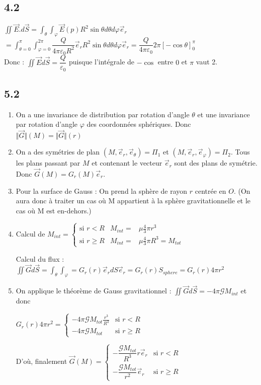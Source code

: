 \documentclass[a4paper,12pt]{book}
\begin{document}
\subsection{4.2}
$\iint \vec{E}.d\vec{S} = \int_\theta\int_\varphi \vec{E}(p)R^2\sin\theta d\theta d\varphi \vec{e}_r$
\\ $=\int_{\theta=0}^{\pi}\int_{\varphi=0}^{2\pi} \dfrac{Q}{4\pi\varepsilon_0R^2}\vec{e}_rR^2\sin\theta d\theta d\varphi \vec{e}_r = \dfrac{Q}{4\pi\varepsilon_0}2\pi\left[-\cos\theta\right]_0^\pi$
\\ Donc : $\iint \vec{E}d\vec{S} = \dfrac{Q}{\varepsilon_0}$ puisque l'intégrale de $-\cos$ entre $0$ et $\pi$ vaut 2.

\subsection{5.2}
\begin{enumerate}
\item On a une invariance de distribution par rotation d'angle $\theta$ et une invariance par rotation d'angle $\varphi$ des coordonnées sphériques. Donc $\Vert\vec{G}\Vert(M) = \Vert\vec{G}\Vert(r)$
\item On a des symétries de plan $(M, \vec{e}_r, \vec{e}_\theta) = \Pi_1$ et $(M, \vec{e}_r, \vec{e}_\varphi) = \Pi_2$. Tous les plans passant par $M$ et contenant le vecteur $\vec{e}_r$ sont des plans de symétrie. Donc $\vec{G}(M) = G_r(M)\vec{e}_r$.
\item Pour la surface de Gauss : On prend la sphère de rayon $r$ centrée en $O$. (On aura donc à traiter un cas où M appartient à la sphère gravitationnelle et le cas où M est en-dehors.)
\item Calcul de $M_{int} = \left\{\begin{array}{rcl} \text{si $r<R$} & M_{int} = & \mu \frac{4}{3}\pi r^3 \\ \text{si $r\geq R$} & M_{int} = & \mu\frac{4}{3}\pi R^3 = M_{tot}\end{array}\right.$
\par Calcul du flux : $ \iint \vec{G} d\vec{S} = \int_\theta\int_\varphi = G_r(r)\vec{e}_rdS\vec{e}_r = G_r(r)S_{sphere} = G_r(r)4\pi r^2$
\item On applique le théorème de Gauss gravitationnel : $\iint \vec{G}d\vec{S} = -4\pi\mathcal{G}M_{int} $ et donc
\par $G_r(r)4\pi r^2 = \left\{\begin{array}{rl} -4\pi\mathcal{G}M_{tot}\frac{r^3}{R^3} & \text{si $r<R$} \\ -4\pi\mathcal{G}M_{tot} & \text{si $r\geq R$}\end{array}\right.$
\par D'où, finalement $\vec{G}(M) = \left\{\begin{array}{rl} -\dfrac{\mathcal{G}M_{tot}}{R^3}r\vec{e}_r & \text{si $r<R$} \\ -\dfrac{\mathcal{G}M_{tot}}{r^2}\vec{e}_r & \text{si $r\geq R$}\end{array}\right.$
\end{enumerate}
\end{document}

